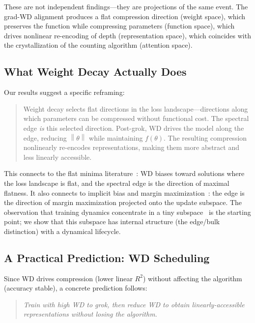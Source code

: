 \documentclass[11pt]{article}
\newcommand{\norm}[1]{\left\|#1\right\|}
\begin{document}
These are not independent findings---they are projections of the same event.
The grad-WD alignment produces a flat compression direction (weight space), which preserves the function while compressing parameters (function space), which drives nonlinear re-encoding of depth (representation space), which coincides with the crystallization of the counting algorithm (attention space).

\subsection{What Weight Decay Actually Does}

Our results suggest a specific reframing:

\begin{quote}
Weight decay selects flat directions in the loss landscape---directions along which parameters can be compressed without functional cost.
The spectral edge \emph{is} this selected direction.
Post-grok, WD drives the model along the edge, reducing $\norm{\theta}$ while maintaining $f(\theta)$.
The resulting compression nonlinearly re-encodes representations, making them more abstract and less linearly accessible.
\end{quote}

This connects to the flat minima literature~\citep{hochreiter1997flat, cohen2021gradient}: WD biases toward solutions where the loss landscape is flat, and the spectral edge is the direction of maximal flatness.
It also connects to implicit bias and margin maximization~\citep{lyu2020gradient, lyu2024dichotomy}: the edge is the direction of margin maximization projected onto the update subspace.
The observation that training dynamics concentrate in a tiny subspace~\citep{gurari2018gradient, sagun2017empirical} is the starting point; we show that this subspace has internal structure (the edge/bulk distinction) with a dynamical lifecycle.

\subsection{A Practical Prediction: WD Scheduling}

Since WD drives compression (lower linear $R^2$) without affecting the algorithm (accuracy stable), a concrete prediction follows:

\begin{quote}
\emph{Train with high WD to grok, then reduce WD to obtain linearly-accessible representations without losing the algorithm.}
\end{quote}
\end{document}
